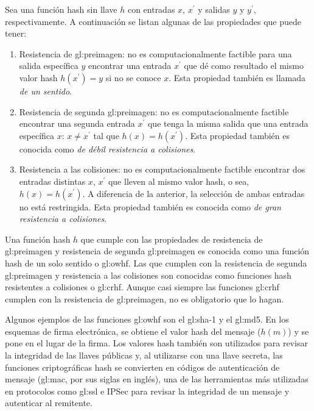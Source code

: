 Sea una función hash sin llave $h$ con entradas $x$, $x^\prime$ y
salidas $y$ y $y^\prime$, respectivamente. A continuación se listan
algunas de las propiedades que puede tener:
\begin{enumerate}
  \item Resistencia de \gls{gl:preimagen}: no es computacionalmente factible
    para una salida específica $y$ encontrar una entrada $x^\prime$ que
    dé como resultado el mismo valor hash $h(x^\prime) = y$ si no se
    conoce $x$. Esta propiedad también es llamada
    \textit{de un sentido}.
  \item Resistencia de segunda \gls{gl:preimagen}: no es computacionalmente
    factible encontrar una segunda entrada $x^\prime$  que tenga la
    misma salida que una entrada específica $x$: $x \neq x^\prime$
    tal que $h(x) = h(x^\prime)$. Esta propiedad también es conocida
    como \textit{de débil resistencia a colisiones}.
  \item Resistencia a las colisiones: no es computacionalmente factible
    encontrar dos entradas distintas $x$, $x^\prime$ que lleven al
    mismo valor hash, o sea, $h(x) = h(x^\prime)$. A diferencia de la
    anterior, la selección de ambas entradas no está restringida. Esta
    propiedad también es conocida como
    \textit{de gran resistencia a colisiones}.
\end{enumerate}

Una función hash $h$ que cumple con las propiedades de resistencia de
\gls{gl:preimagen} y resistencia de segunda \gls{gl:preimagen} es conocida como 
una función hash de un solo sentido o \gls{gl:owhf}. 
Las que cumplen con la resistencia de segunda \gls{gl:preimagen} y
resistencia a las colisiones son conocidas como funciones hash
resistentes a colisiones o \gls{gl:crhf}. Aunque casi siempre las
funciones \gls{gl:crhf} cumplen con la resistencia de \gls{gl:preimagen}, 
no es obligatorio que lo hagan.

Algunos ejemplos de las funciones \gls{gl:owhf} son el \gls{gl:sha}-1
y el \gls{gl:md5}. En los esquemas de firma electrónica, se obtiene el 
valor hash del mensaje ($h(m)$) y se pone en el lugar de la firma. Los valores
hash también son utilizados para revisar la integridad de las llaves
públicas y, al utilizarse con una llave secreta, las funciones
criptográficas hash se convierten en códigos de autenticación de mensaje 
(\gls{gl:mac}, por sus siglas en inglés), una de las herramientas más
utilizadas en protocolos como \gls{gl:ssl} e IPSec para revisar la 
integridad de un mensaje y autenticar al remitente.


